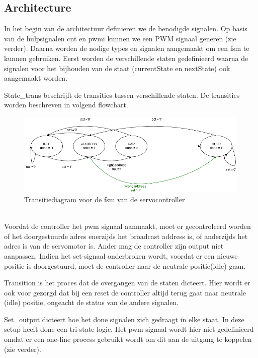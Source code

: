 \subsection{Architecture}
In het begin van de architectuur definieren we de benodigde signalen. Op basis van de hulpsignalen cnt en pwmi kunnen we een PWM signaal generen (zie verder). Daarna worden de nodige types en signalen aangemaakt om een \gls{fsm} te kunnen gebruiken. Eerst worden de verschillende staten gedefinieerd waarna de signalen voor het bijhouden van de staat (currentState en nextState) ook aangemaakt worden.


State\_trans beschrijft de transities tussen verschillende staten. De transities worden beschreven in volgend flowchart.
\begin{figure}[h]
	\centering
	\includegraphics[width=\linewidth]{servocontrol.png}
	\caption{Transitiediagram voor de \gls{fsm} van de servocontroller}
\end{figure}\\
 Voordat de controller het \gls{pwm} signaal aanmaakt, moet er gecontroleerd worden of het doorgestuurde adres enerzijds het broadcast address is, of anderzijds het adres is van de servomotor is. Ander mag de controller zijn output niet aanpassen. Indien het set-signaal onderbroken wordt, voordat er een nieuwe positie is doorgestuurd, moet de controller naar de neutrale positie(idle) gaan.


Transition is het proces dat de overgangen van de staten dicteert. Hier wordt er ook voor gezorgd dat bij een reset de controller altijd terug gaat naar neutrale (idle) positie, ongeacht de status van de andere signalen.


Set\_output dicteert hoe het done signalen zich gedraagt in elke staat. In deze setup heeft done een tri-state logic. Het \gls{pwm} signaal wordt hier niet gedefinieerd omdat er een one-line process gebruikt wordt om dit aan de uitgang te koppelen (zie verder).

